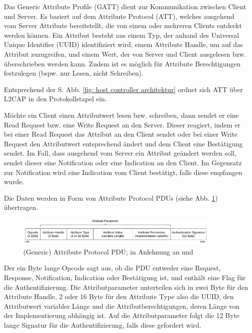 Das Generic Attribute Profile (GATT) dient zur Kommunikation zwischen Client und Server. Es basiert auf dem Attribute Protocol (ATT), welches ausgehend vom Server Attribute bereitstellt, die von einem oder mehreren Clients entdeckt werden können. Ein Attribut besteht aus einem Typ, der anhand des Universal Unique Identifier (UUID) identifiziert wird, einem Attribute Handle, um auf das Attribut zuzugreifen, und einem Wert, der von Server und Client ausgelesen bzw. überschrieben werden kann. Zudem ist es möglich für Attribute Berechtigungen festzulegen (bspw. nur Lesen, nicht Schreiben). \cite{BtSpec4.0_1835}

Entsprechend der S. \pageref{fig: host controller architektur} Abb. \ref{fig: host controller architektur} ordnet sich ATT über L2CAP in den Protokollstapel ein.

Möchte ein Client einen Attributwert lesen bzw. schreiben, dann sendet er eine Read Request bzw. eine Write Request an den Server. Dieser reagiert, indem er bei einer Read Request das Attribut an den Client sendet oder bei einer Write Request den Attributwert entsprechend ändert und dem Client eine Bestätigung sendet. Im Fall, dass ausgehend vom Server ein Attribut geändert werden soll, sendet dieser eine Notification oder eine Indication an den Client. Im Gegensatz zur Notification wird eine Indication vom Client bestätigt, falls diese empfangen wurde. \cite{BtSpec4.0_1854-1855} \cite{BtSpec4.0_1861-1863}

Die Daten werden in Form von Attribute Protocol PDUs (siehe Abb. \ref{fig: att pdu}) übertragen.

\begin{figure}[H]
    \centering
    \includegraphics[width=0.9\textwidth]{graphics/att_pdu.pdf}
    \caption[(Generic) Attribute Protocol PDU]{(Generic) Attribute Protocol PDU; in Anlehnung an \cite{BtSpec4.0_fig_1888} und \cite{BtSpec4.0_fig_1889}}
    \label{fig: att pdu}
\end{figure}

Der ein Byte lange Opcode sagt aus, ob die PDU entweder eine Request, Response, Notification, Indication oder Bestätigung ist, und enthält eine Flag für die Authentifizierung. Die Attributparameter unterteilen sich in zwei Byte für den Attribute Handle, 2 oder 16 Byte für den Attribute Type also die UUID, den Attributwert variabler Länge und die Attributberechtigungen, deren Länge von der Implementierung abhängig ist. Auf die Attributparameter folgt die 12 Byte lange Signatur für die Authentifizierung, falls diese gefordert wird. \cite{BtSpec4.0_1888-1889}
\\\\

